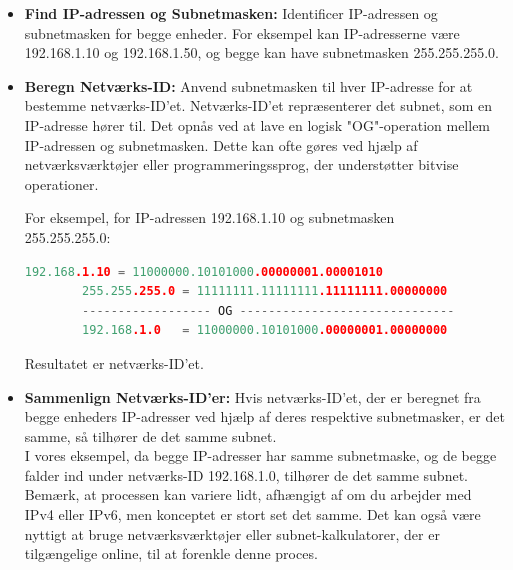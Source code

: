 \begin{itemize}
	\item \textbf{Find IP-adressen og Subnetmasken:} Identificer IP-adressen og subnetmasken for begge enheder. For eksempel kan IP-adresserne være 192.168.1.10 og 192.168.1.50, og begge kan have subnetmasken 255.255.255.0.
	\item \textbf{Beregn Netværks-ID:} Anvend subnetmasken til hver IP-adresse for at bestemme netværks-ID'et. Netværks-ID'et repræsenterer det subnet, som en IP-adresse hører til. Det opnås ved at lave en logisk "OG"-operation mellem IP-adressen og subnetmasken. Dette kan ofte gøres ved hjælp af netværksværktøjer eller programmeringssprog, der understøtter bitvise operationer.
	
	For eksempel, for IP-adressen 192.168.1.10 og subnetmasken \\
	255.255.255.0:
	\begin{lstlisting}[language=C++, caption=Syntaks]
		192.168.1.10 = 11000000.10101000.00000001.00001010
		255.255.255.0 = 11111111.11111111.11111111.00000000
		------------------ OG ------------------------------
		192.168.1.0   = 11000000.10101000.00000001.00000000
	\end{lstlisting}
	Resultatet er netværks-ID'et.
	\item \textbf{Sammenlign Netværks-ID'er:} Hvis netværks-ID'et, der er beregnet fra begge enheders IP-adresser ved hjælp af deres respektive subnetmasker, er det samme, så tilhører de det samme subnet.\\
	
	I vores eksempel, da begge IP-adresser har samme subnetmaske, og de begge falder ind under netværks-ID 192.168.1.0, tilhører de det samme subnet.\\
	
	Bemærk, at processen kan variere lidt, afhængigt af om du arbejder med IPv4 eller IPv6, men konceptet er stort set det samme. Det kan også være nyttigt at bruge netværksværktøjer eller subnet-kalkulatorer, der er tilgængelige online, til at forenkle denne proces.
\end{itemize}

